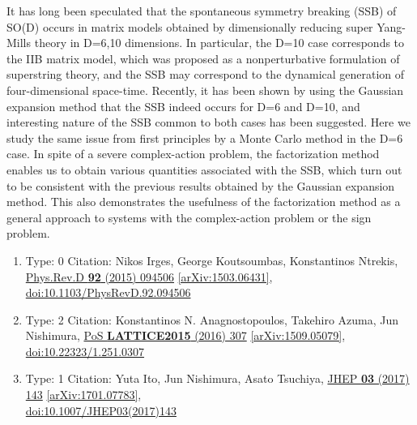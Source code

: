 \documentclass[a4paper,10pt]{article}
\begin{document}
\begin{enumerate}
It has long been speculated that the spontaneous symmetry breaking (SSB) of SO(D) occurs in matrix models obtained by dimensionally reducing super Yang-Mills theory in D=6,10 dimensions. In particular, the D=10 case corresponds to the IIB matrix model, which was proposed as a nonperturbative formulation of superstring theory, and the SSB may correspond to the dynamical generation of four-dimensional space-time. Recently, it has been shown by using the Gaussian expansion method that the SSB indeed occurs for D=6 and D=10, and interesting nature of the SSB common to both cases has been suggested. Here we study the same issue from first principles by a Monte Carlo method in the D=6 case. In spite of a severe complex-action problem, the factorization method enables us to obtain various quantities associated with the SSB, which turn out to be consistent with the previous results obtained by the Gaussian expansion method. This also demonstrates the usefulness of the factorization method as a general approach to systems with the complex-action problem or the sign problem.
\begin{enumerate}
  \item Type: 0 Citation: Nikos Irges, George Koutsoumbas, Konstantinos Ntrekis, \href{https://www.doi.org/10.1103/PhysRevD.92.094506}{Phys.Rev.D {\bf 92} (2015) 094506}  \href{https://arxiv.org/abs/1503.06431}{[arXiv:1503.06431]},\\\href{https://www.doi.org/10.1103/PhysRevD.92.094506}{doi:10.1103/PhysRevD.92.094506}
  \item Type: 2 Citation: Konstantinos N. Anagnostopoulos, Takehiro Azuma, Jun Nishimura, \href{https://www.doi.org/10.22323/1.251.0307}{PoS {\bf LATTICE2015} (2016) 307}  \href{https://arxiv.org/abs/1509.05079}{[arXiv:1509.05079]},\\\href{https://www.doi.org/10.22323/1.251.0307}{doi:10.22323/1.251.0307}
  \item Type: 1 Citation: Yuta Ito, Jun Nishimura, Asato Tsuchiya, \href{https://www.doi.org/10.1007/JHEP03(2017)143}{JHEP {\bf 03} (2017) 143}  \href{https://arxiv.org/abs/1701.07783}{[arXiv:1701.07783]},\\\href{https://www.doi.org/10.1007/JHEP03(2017)143}{doi:10.1007/JHEP03(2017)143}

\end{enumerate}
\end{enumerate}
\end{document}
